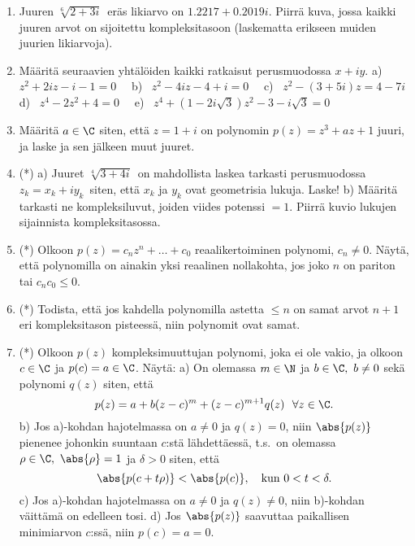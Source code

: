 \begin{enumerate}
\item
Juuren $\sqrt[6]{2+3i}\,$ eräs likiarvo on $1.2217+0.2019i$. Piirrä kuva, jossa kaikki juuren
arvot on sijoitettu kompleksitasoon (laskematta erikseen muiden juurien likiarvoja).

\item
Määritä seuraavien yhtälöiden kaikki ratkaisut perusmuodossa $x+iy$. \newline
a) \ $z^2+2iz-i-1=0 \quad$ 
b) \ $z^2-4iz-4+i=0 \quad$
c) \ $z^2-(3+5i)z=4-7i$ \newline
d) \ $z^4-2z^2+4=0 \quad $ 
e) \ $z^4+(1-2i\sqrt{3})z^2-3-i\sqrt{3}=0$

\item
Määritä $a\in\C$ siten, että $z=1+i$ on polynomin $p(z)=z^3+az+1$ juuri, ja laske ja sen
jälkeen muut juuret.

\item (*) a) Juuret $\sqrt[4]{3+4i}\,$ on mahdollista laskea tarkasti perusmuodossa
$z_k=x_k+iy_k\,$ siten, että $x_k$ ja $y_k$ ovat geometrisia lukuja. Laske! \vspace{1mm}\newline
b) Määritä tarkasti ne kompleksiluvut, joiden viides potenssi $=1$. Piirrä kuvio lukujen
sijainnista kompleksitasossa.

\item (*)
Olkoon $p(z)=c_n z^n + \ldots + c_0$ reaalikertoiminen polynomi, $c_n \neq 0$. Näytä, että 
polynomilla on ainakin yksi reaalinen nollakohta, jos joko $n$ on pariton tai $c_n c_0 \le 0$.

\item (*)
Todista, että jos kahdella polynomilla astetta $\le n$ on samat arvot $n+1$ eri kompleksitason
pisteessä, niin polynomit ovat samat.

\item (*) \label{H-III-3: avaintulos}
Olkoon $p(z)$ kompleksimuuttujan polynomi, joka ei ole vakio, ja olkoon $c\in\C$ ja 
$p(c)=a\in\C$. Näytä: \vspace{1mm}\newline
a) On olemassa $m\in\N$ ja $b\in\C,\ b \neq 0$ sekä polynomi $q(z)$ siten, että 
\[
p(z)=a+b(z-c)^m+(z-c)^{m+1}q(z)\ \ \forall z\in\C.
\]
b) Jos a)-kohdan hajotelmassa on $a\neq 0$ ja $q(z)=0$, niin $\abs{p(z)}$ pienenee johonkin
suuntaan $c$:stä lähdettäessä, t.s.\ on olemassa $\rho\in\C,\ \abs{\rho}=1$ ja $\delta>0$
siten, että
\[
\abs{p(c+t\rho)} < \abs{p(c)}, \quad \text{kun}\ 0<t<\delta.
\]
c) Jos a)-kohdan hajotelmassa on $a \neq 0$ ja $q(z) \ne 0$, niin b)-kohdan väittämä on
edelleen tosi. \newline
d) Jos $\abs{p(z)}$ saavuttaa paikallisen minimiarvon $c$:ssä, niin $p(c)=a=0$.

\end{enumerate}